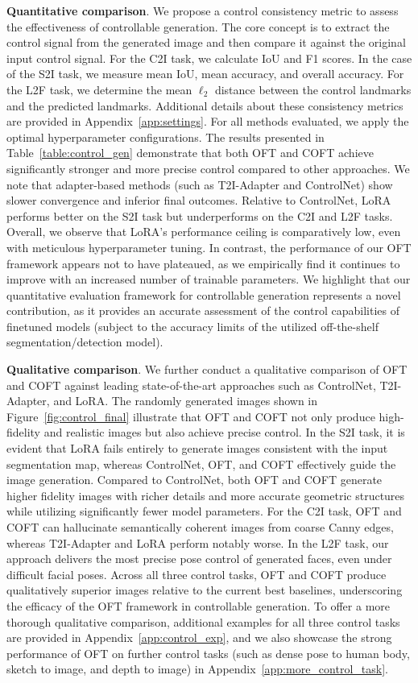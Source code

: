 \textbf{Quantitative comparison}. We propose a control consistency metric to assess the effectiveness of controllable generation. The core concept is to extract the control signal from the generated image and then compare it against the original input control signal. For the C2I task, we calculate IoU and F1 scores. In the case of the S2I task, we measure mean IoU, mean accuracy, and overall accuracy. For the L2F task, we determine the mean $\ell_2$ distance between the control landmarks and the predicted landmarks. Additional details about these consistency metrics are provided in Appendix~\ref{app:settings}. For all methods evaluated, we apply the optimal hyperparameter configurations. The results presented in Table~\ref{table:control_gen} demonstrate that both OFT and COFT achieve significantly stronger and more precise control compared to other approaches. We note that adapter-based methods (such as T2I-Adapter and ControlNet) show slower convergence and inferior final outcomes. Relative to ControlNet, LoRA performs better on the S2I task but underperforms on the C2I and L2F tasks. Overall, we observe that LoRA’s performance ceiling is comparatively low, even with meticulous hyperparameter tuning. In contrast, the performance of our OFT framework appears not to have plateaued, as we empirically find it continues to improve with an increased number of trainable parameters. We highlight that our quantitative evaluation framework for controllable generation represents a novel contribution, as it provides an accurate assessment of the control capabilities of finetuned models (subject to the accuracy limits of the utilized off-the-shelf segmentation/detection model).

\textbf{Qualitative comparison}. We further conduct a qualitative comparison of OFT and COFT against leading state-of-the-art approaches such as ControlNet, T2I-Adapter, and LoRA. The randomly generated images shown in Figure~\ref{fig:control_final} illustrate that OFT and COFT not only produce high-fidelity and realistic images but also achieve precise control. In the S2I task, it is evident that LoRA fails entirely to generate images consistent with the input segmentation map, whereas ControlNet, OFT, and COFT effectively guide the image generation. Compared to ControlNet, both OFT and COFT generate higher fidelity images with richer details and more accurate geometric structures while utilizing significantly fewer model parameters. For the C2I task, OFT and COFT can hallucinate semantically coherent images from coarse Canny edges, whereas T2I-Adapter and LoRA perform notably worse. In the L2F task, our approach delivers the most precise pose control of generated faces, even under difficult facial poses. Across all three control tasks, OFT and COFT produce qualitatively superior images relative to the current best baselines, underscoring the efficacy of the OFT framework in controllable generation. To offer a more thorough qualitative comparison, additional examples for all three control tasks are provided in Appendix~\ref{app:control_exp}, and we also showcase the strong performance of OFT on further control tasks (such as dense pose to human body, sketch to image, and depth to image) in Appendix~\ref{app:more_control_task}.

